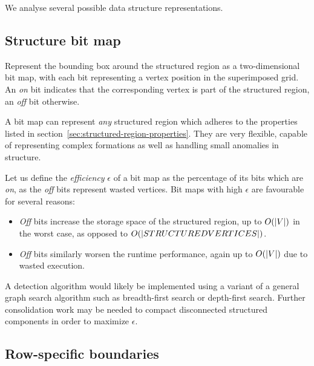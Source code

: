 We analyse several possible data structure representations.

\subsection{Structure bit map}

\newcommand{\drawbitmap}[2]{
	
}

Represent the bounding box around the structured region as a two-dimensional bit map, with each bit representing a vertex position in the superimposed grid. An \emph{on} bit indicates that the corresponding vertex is part of the structured region, an \emph{off} bit otherwise.

\drawbitmap{images/bitmap-representation/}{plain-bitmap}

A bit map can represent \emph{any} structured region which adheres to the properties listed in section~\ref{sec:structured-region-properties}. They are very flexible, capable of representing complex formations as well as handling small anomalies in structure.

Let us define the \emph{efficiency} $\epsilon$ of a bit map as the percentage of its bits which are \emph{on}, as the \emph{off} bits represent wasted vertices. Bit maps with high $\epsilon$ are favourable for several reasons:
\begin{itemize}
\item \emph{Off} bits increase the storage space of the structured region, up to $O(\left\vert{V}\right\vert)$ in the worst case, as opposed to $O(\left\vert{STRUCTURED VERTICES}\right\vert)$.
\item \emph{Off} bits similarly worsen the runtime performance, again up to $O(\left\vert{V}\right\vert)$ due to wasted execution.
\end{itemize}

A detection algorithm would likely be implemented using a variant of a general graph search algorithm such as breadth-first search or depth-first search. Further consolidation work may be needed to compact disconnected structured components in order to maximize $\epsilon$.
\drawbitmap{images/bitmap-representation/}{disjoint-bitmap}
\drawbitmap{images/bitmap-representation/}{disjoint2-bitmap}



\subsection{Row-specific boundaries}

